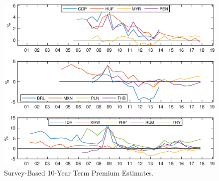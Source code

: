 	\begin{figure}[!htbp]
		\begin{centering}
			\includegraphics[width=1\textwidth,height=0.5\textheight]{../Figures/Temp/temp_tp10yrSvy}
			\par\end{centering}
		\caption{Survey-Based 10-Year Term Premium Estimates.}\label{fig:temp_tp10yrSvy}
	\end{figure}